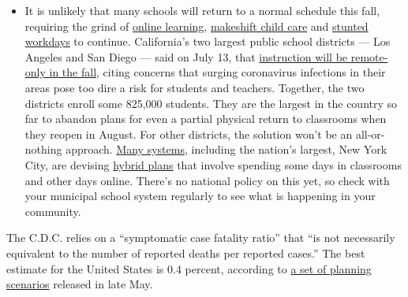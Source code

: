 \begin{itemize}
  \begin{itemize}
  \tightlist
  \item
    It is unlikely that many schools will return to a normal schedule
    this fall, requiring the grind of
    \href{https://www.nytimes.com/2020/06/05/us/coronavirus-education-lost-learning.html?action=click\&pgtype=Article\&state=default\&region=MAIN_CONTENT_3\&context=storylines_faq}{online
    learning},
    \href{https://www.nytimes.com/2020/05/29/us/coronavirus-child-care-centers.html?action=click\&pgtype=Article\&state=default\&region=MAIN_CONTENT_3\&context=storylines_faq}{makeshift
    child care} and
    \href{https://www.nytimes.com/2020/06/03/business/economy/coronavirus-working-women.html?action=click\&pgtype=Article\&state=default\&region=MAIN_CONTENT_3\&context=storylines_faq}{stunted
    workdays} to continue. California's two largest public school
    districts --- Los Angeles and San Diego --- said on July 13, that
    \href{https://www.nytimes.com/2020/07/13/us/lausd-san-diego-school-reopening.html?action=click\&pgtype=Article\&state=default\&region=MAIN_CONTENT_3\&context=storylines_faq}{instruction
    will be remote-only in the fall}, citing concerns that surging
    coronavirus infections in their areas pose too dire a risk for
    students and teachers. Together, the two districts enroll some
    825,000 students. They are the largest in the country so far to
    abandon plans for even a partial physical return to classrooms when
    they reopen in August. For other districts, the solution won't be an
    all-or-nothing approach.
    \href{https://bioethics.jhu.edu/research-and-outreach/projects/eschool-initiative/school-policy-tracker/}{Many
    systems}, including the nation's largest, New York City, are
    devising
    \href{https://www.nytimes.com/2020/06/26/us/coronavirus-schools-reopen-fall.html?action=click\&pgtype=Article\&state=default\&region=MAIN_CONTENT_3\&context=storylines_faq}{hybrid
    plans} that involve spending some days in classrooms and other days
    online. There's no national policy on this yet, so check with your
    municipal school system regularly to see what is happening in your
    community.
  \end{itemize}
\end{itemize}

The C.D.C. relies on a ``symptomatic case fatality ratio'' that ``is not
necessarily equivalent to the number of reported deaths per reported
cases.'' The best estimate for the United States is 0.4 percent,
according to
\href{https://www.cdc.gov/coronavirus/2019-ncov/hcp/planning-scenarios.html}{a
set of planning scenarios} released in late May.

